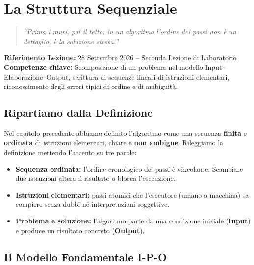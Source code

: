 \chapter{La Struttura Sequenziale}
\label{chap:sequenza}

\begin{quote}
\itshape
\small
``Prima i muri, poi il tetto: in un algoritmo l'ordine dei passi non è un dettaglio, è la soluzione stessa.''
\end{quote}
\vspace{1em}

\noindent\textbf{Riferimento Lezione:} 28 Settembre 2026 -- Seconda Lezione di Laboratorio\\
\textbf{Competenze chiave:} Scomposizione di un problema nel modello Input--Elaborazione--Output, scrittura di sequenze lineari di istruzioni elementari, riconoscimento degli errori tipici di ordine e di ambiguità.

\vspace{1.5em}

\section{Ripartiamo dalla Definizione}

Nel capitolo precedente abbiamo definito l'algoritmo come una sequenza \textbf{finita} e \textbf{ordinata} di istruzioni elementari, chiare e \textbf{non ambigue}. Rileggiamo la definizione mettendo l'accento su tre parole:

\begin{itemize}
  \item \textbf{Sequenza ordinata:} l'ordine cronologico dei passi è vincolante. Scambiare due istruzioni altera il risultato o blocca l'esecuzione.
  \item \textbf{Istruzioni elementari:} passi atomici che l'esecutore (umano o macchina) sa compiere senza dubbi né interpretazioni soggettive.
  \item \textbf{Problema e soluzione:} l'algoritmo parte da una condizione iniziale (\textbf{Input}) e produce un risultato concreto (\textbf{Output}).
\end{itemize}

\section{Il Modello Fondamentale I-P-O}

